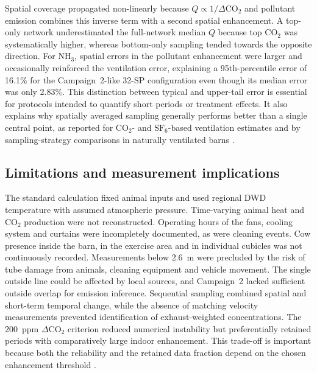 \documentclass[12pt,a4paper]{article}
\begin{document}
Spatial coverage propagated non-linearly because \(Q\propto1/\Delta\mathrm{CO_2}\) and pollutant emission combines this inverse term with a second spatial enhancement. A top-only network underestimated the full-network median \(Q\) because top \(\mathrm{CO_2}\) was systematically higher, whereas bottom-only sampling tended towards the opposite direction. For \(\mathrm{NH_3}\), spatial errors in the pollutant enhancement were larger and occasionally reinforced the ventilation error, explaining a 95th-percentile error of 16.1\% for the Campaign~2-like 32-SP configuration even though its median error was only 2.83\%. This distinction between typical and upper-tail error is essential for protocols intended to quantify short periods or treatment effects. It also explains why spatially averaged sampling generally performs better than a single central point, as reported for \(\mathrm{CO_2}\)- and \(\mathrm{SF_6}\)-based ventilation estimates and by sampling-strategy comparisons in naturally ventilated barns \citep{JankeSampling2020,Mendes2015}.

\subsection{Limitations and measurement implications}

The standard calculation fixed animal inputs and used regional DWD temperature with assumed atmospheric pressure. Time-varying animal heat and \(\mathrm{CO_2}\) production were not reconstructed. Operating hours of the fans, cooling system and curtains were incompletely documented, as were cleaning events. Cow presence inside the barn, in the exercise area and in individual cubicles was not continuously recorded. Measurements below \SI{2.6}{m} were precluded by the risk of tube damage from animals, cleaning equipment and vehicle movement. The single outside line could be affected by local sources, and Campaign~2 lacked sufficient outside overlap for emission inference. Sequential sampling combined spatial and short-term temporal change, while the absence of matching velocity measurements prevented identification of exhaust-weighted concentrations. The \SI{200}{ppm} \(\Delta\mathrm{CO_2}\) criterion reduced numerical instability but preferentially retained periods with comparatively large indoor enhancement. This trade-off is important because both the reliability and the retained data fraction depend on the chosen enhancement threshold \citep{Wang2016,Apostolico2026}.
\end{document}
